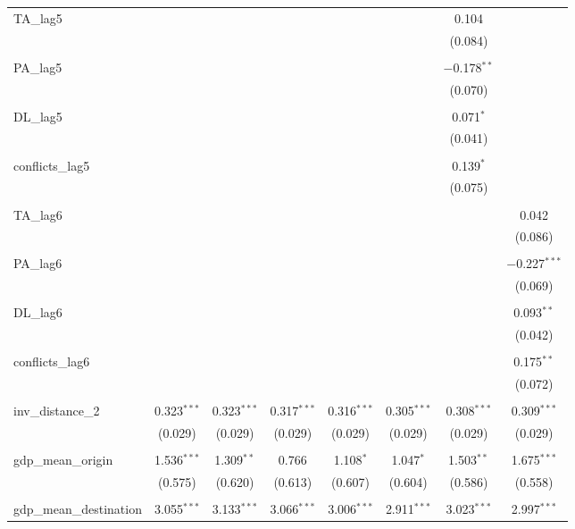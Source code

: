 \begin{table}[!htbp]
\begin{tabular}{@{\extracolsep{5pt}}lccccccc}
 TA\_lag5 &  &  &  &  &  & 0.104 &  \\ 
  &  &  &  &  &  & (0.084) &  \\ 
  & & & & & & & \\ 
 PA\_lag5 &  &  &  &  &  & $-$0.178$^{**}$ &  \\ 
  &  &  &  &  &  & (0.070) &  \\ 
  & & & & & & & \\ 
 DL\_lag5 &  &  &  &  &  & 0.071$^{*}$ &  \\ 
  &  &  &  &  &  & (0.041) &  \\ 
  & & & & & & & \\ 
 conflicts\_lag5 &  &  &  &  &  & 0.139$^{*}$ &  \\ 
  &  &  &  &  &  & (0.075) &  \\ 
  & & & & & & & \\ 
 TA\_lag6 &  &  &  &  &  &  & 0.042 \\ 
  &  &  &  &  &  &  & (0.086) \\ 
  & & & & & & & \\ 
 PA\_lag6 &  &  &  &  &  &  & $-$0.227$^{***}$ \\ 
  &  &  &  &  &  &  & (0.069) \\ 
  & & & & & & & \\ 
 DL\_lag6 &  &  &  &  &  &  & 0.093$^{**}$ \\ 
  &  &  &  &  &  &  & (0.042) \\ 
  & & & & & & & \\ 
 conflicts\_lag6 &  &  &  &  &  &  & 0.175$^{**}$ \\ 
  &  &  &  &  &  &  & (0.072) \\ 
  & & & & & & & \\ 
 inv\_distance\_2 & 0.323$^{***}$ & 0.323$^{***}$ & 0.317$^{***}$ & 0.316$^{***}$ & 0.305$^{***}$ & 0.308$^{***}$ & 0.309$^{***}$ \\ 
  & (0.029) & (0.029) & (0.029) & (0.029) & (0.029) & (0.029) & (0.029) \\ 
  & & & & & & & \\ 
 gdp\_mean\_origin & 1.536$^{***}$ & 1.309$^{**}$ & 0.766 & 1.108$^{*}$ & 1.047$^{*}$ & 1.503$^{**}$ & 1.675$^{***}$ \\ 
  & (0.575) & (0.620) & (0.613) & (0.607) & (0.604) & (0.586) & (0.558) \\ 
  & & & & & & & \\ 
 gdp\_mean\_destination & 3.055$^{***}$ & 3.133$^{***}$ & 3.066$^{***}$ & 3.006$^{***}$ & 2.911$^{***}$ & 3.023$^{***}$ & 2.997$^{***}$ \\ 

\end{tabular}
\end{table}
